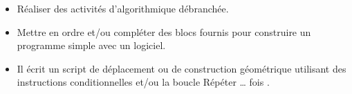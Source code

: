 \begin{prerequis}      
    \begin{itemize}  
        \item Réaliser des activités d’algorithmique débranchée.
        \item Mettre en ordre et/ou compléter des blocs fournis pour construire un programme simple avec un logiciel.
        \columnbreak
        \item Il écrit un script de déplacement ou de construction géométrique utilisant des instructions conditionnelles et/ou la boucle \og Répéter \dots{} fois \fg.
      \end{itemize}
\end{prerequis}